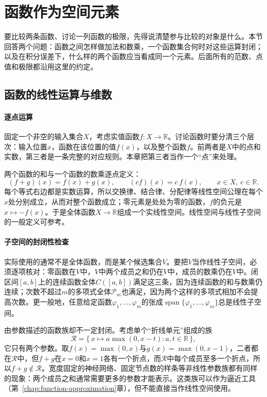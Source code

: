 
\section{函数作为空间元素}
\label{sec:fs-elements}

要比较两条函数、讨论一列函数的极限，先得说清楚参与比较的对象是什么。本节回答两个问题：函数之间怎样做加法和数乘，一个函数集合何时对这些运算封闭；以及在积分误差下，什么样的两个函数应当看成同一个元素。后面所有的范数、点值和极限都沿用这里的约定。

\subsection{函数的线性运算与维数}
\label{sec:fs-linear-structure}

\paragraph{逐点运算}
固定一个非空的输入集合$X$，考虑实值函数$f:X\to\mathbb R$。讨论函数时要分清三个层次：输入位置$x$，函数在该位置的值$f(x)$，以及整个函数$f$。前两者是$X$中的点和实数，第三者是一条完整的对应规则。本章把第三者当作一个“点”来处理。

两个函数的和与一个函数的数乘逐点定义：
\[
 (f+g)(x)=f(x)+g(x),\qquad (cf)(x)=c\,f(x),\qquad x\in X,\ c\in\mathbb R .
\]
每个等式右边都是实数运算，所以交换律、结合律、分配律等线性空间公理在每个$x$处分别成立，从而对整个函数成立；零元素是处处为零的函数，$f$的负元是$x\mapsto-f(x)$。于是全体函数$X\to\mathbb R$组成一个实线性空间。线性空间与线性子空间的一般定义可参考。

\paragraph{子空间的封闭性检查}
实际使用的通常不是全体函数，而是某个候选集合$V$。要把$V$当作线性子空间，必须逐项核对：零函数在$V$中，$V$中两个成员之和仍在$V$中，成员的数乘仍在$V$中。闭区间$[a,b]$上的连续函数全体$C([a,b])$满足这三条，因为连续函数的和与数乘仍连续；次数不超过$m$的多项式全体$\mathcal P_m$也满足，因为两个这样的多项式相加不会提高次数。更一般地，任意给定函数$\varphi_1,\ldots,\varphi_m$的张成$\operatorname{span}\{\varphi_1,\ldots,\varphi_m\}$总是线性子空间。

由参数描述的函数族却不一定封闭。考虑单个“折线单元”组成的族
\[
 \mathcal R=\{\,x\mapsto a\max(0,x-t):a,t\in\mathbb R\,\},
\]
它只有两个参数。取$f(x)=\max(0,x)$与$g(x)=\max(0,x-1)$，二者都在$\mathcal R$中，但$f+g$在$x=0$和$x=1$各有一个折点，而$\mathcal R$中每个成员至多一个折点，所以$f+g\notin\mathcal R$。宽度固定的神经网络、固定节点数的样条等非线性参数族都有同样的现象：两个成员之和通常需要更多的参数才能表示。这类族可以作为逼近工具（第~\ref{chap:function-approximation}章），但不能直接当作线性空间使用。


